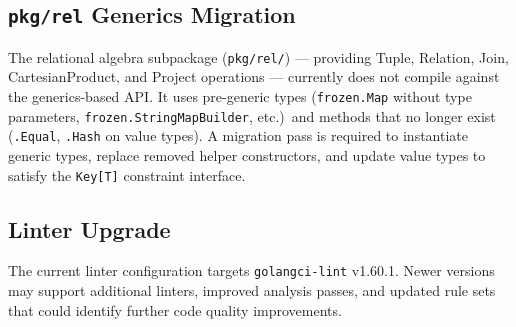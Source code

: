 \documentclass[11pt,twocolumn]{article}
\begin{document}
\subsection{\texttt{pkg/rel} Generics Migration}

The relational algebra subpackage (\texttt{pkg/rel/}) --- providing Tuple,
Relation, Join, CartesianProduct, and Project operations --- currently does
not compile against the generics-based API\@.
It uses pre-generic types (\texttt{frozen.Map} without type parameters,
\texttt{frozen.StringMapBuilder}, etc.)\ and methods that no longer exist
(\texttt{.Equal}, \texttt{.Hash} on value types).
A migration pass is required to instantiate generic types, replace removed
helper constructors, and update value types to satisfy the
\texttt{Key[T]} constraint interface.

\subsection{Linter Upgrade}

The current linter configuration targets \texttt{golangci-lint} v1.60.1.
Newer versions may support additional linters, improved analysis passes,
and updated rule sets that could identify further code quality
improvements.
\end{document}
